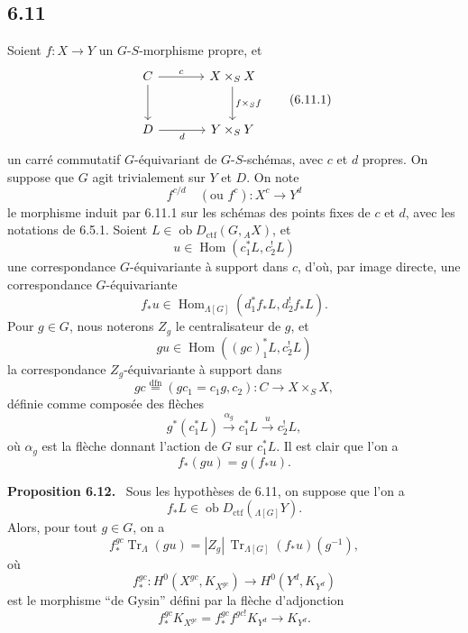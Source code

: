 \documentclass[11pt]{article}
\newenvironment{statement}[1]{\par\medskip\noindent\textbf{#1.}\ }{\par\medskip}
\DeclareMathOperator{\Hom}{Hom}
\providecommand{\Tr}{\operatorname{Tr}}
\providecommand{\Tr}{\operatorname{Tr}}
\providecommand{\Ob}{\operatorname{ob}}
\providecommand{\Tr}{\operatorname{Tr}}
\providecommand{\Hom}{\operatorname{Hom}}
\providecommand{\Ob}{\operatorname{ob}}
\providecommand{\Tr}{\operatorname{Tr}}
\providecommand{\Ob}{\operatorname{Ob}}
\providecommand{\Hom}{\operatorname{Hom}}
\providecommand{\Tr}{\operatorname{Tr}}
\providecommand{\Ob}{\operatorname{ob}}
\providecommand{\Ob}{\operatorname{Ob}}
\begin{document}
\subsection*{6.11}
Soient $f:X\to Y$ un $G$-$S$-morphisme propre, et
\begin{equation}
\begin{tikzcd}[column sep=large,row sep=large]
C \arrow[r,"c"] \arrow[d] & X\times_SX \arrow[d,"f\times_Sf"]\\
D \arrow[r,"d"'] & Y\times_SY
\end{tikzcd}
\tag{6.11.1}
\end{equation}
un carré commutatif $G$-équivariant de $G$-$S$-schémas, avec $c$ et $d$ propres. On suppose que $G$ agit trivialement sur $Y$ et $D$. On note
\begin{equation}
f^{c/d}\quad(\text{ou } f^c):X^c\longrightarrow Y^d
\tag{6.11.2}
\end{equation}
le morphisme induit par 6.11.1 sur les schémas des points fixes de $c$ et $d$, avec les notations de 6.5.1. Soient $L\in\Ob D_{\mathrm{ctf}}(G,{}_AX)$, et
\[
u\in\Hom(c_1^*L,c_2^!L)
\]
une correspondance $G$-équivariante à support dans $c$, d'où, par image directe, une correspondance $G$-équivariante
\[
f_*u\in\Hom_{\Lambda[G]}(d_1^*f_*L,d_2^!f_*L).
\]
Pour $g\in G$, nous noterons $Z_g$ le centralisateur de $g$, et
\begin{equation}
gu\in\Hom((gc)_1^*L,c_2^!L)
\tag{6.11.3}
\end{equation}
la correspondance $Z_g$-équivariante à support dans
\begin{equation}
gc\stackrel{\mathrm{dfn}}{=}(gc_1=c_1g,c_2):C\to X\times_SX,
\tag{6.11.4}
\end{equation}
définie comme composée des flèches
\[
g^*(c_1^*L)\xrightarrow{\alpha_g}c_1^*L\xrightarrow{u}c_2^!L,
\]
où $\alpha_g$ est la flèche donnant l'action de $G$ sur $c_1^*L$. Il est clair que l'on a
\begin{equation}
f_*(gu)=g(f_*u).
\tag{6.11.5}
\end{equation}

\begin{statement}{Proposition 6.12}
Sous les hypothèses de 6.11, on suppose que l'on a
\[
f_*L\in\Ob D_{\mathrm{ctf}}({}_{\Lambda[G]}Y).
\]
Alors, pour tout $g\in G$, on a
\begin{equation}
f_*^{gc}\Tr_{\Lambda}(gu)
=
|Z_g|\,\Tr_{\Lambda[G]}(f_*u)(g^{-1}),
\tag{6.12.1}
\end{equation}
où
\[
f_*^{gc}:H^0(X^{gc},K_{X^{gc}})\longrightarrow H^0(Y^d,K_{Y^d})
\]
est le morphisme ``de Gysin'' défini par la flèche d'adjonction
\[
f_*^{gc}K_{X^{gc}}=f_*^{gc}f^{gc!}K_{Y^d}\longrightarrow K_{Y^d}.
\]
\end{statement}
\end{document}
